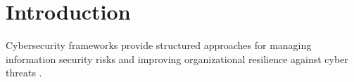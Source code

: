 \chapter*{Introduction}

Cybersecurity frameworks provide structured approaches for managing information security risks and improving organizational resilience against cyber threats \parencite{nist2024}.